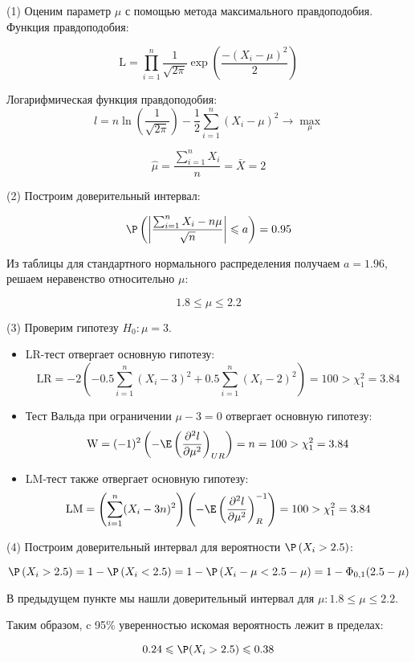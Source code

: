 \documentclass[pdftex,11pt,openany]{book}\usepackage[]{graphicx}\usepackage[]{color}
\begin{document}
\begin{solution}
(1) Оценим параметр $\mu$ с помощью метода максимального правдоподобия. Функция правдоподобия:

\[
\text{L} = \prod_{i=1}^{n} \frac{1}{\sqrt{2\pi}}\exp\left( \frac{-\left( X_i -\mu\right) ^2}{2}\right)
\]

Логарифмическая функция правдоподобия:
\[l = n \ln \left( \frac{1}{\sqrt{2\pi}}\right) - \frac{1}{2}\sum_{i=1}^{n}\left( X_i-\mu\right) ^2 \to \max_\mu\]

\[\hat{\mu} = \frac{\sum_{i=1}^{n}X_i}{n} = \bar{X} = 2\]

(2) Построим доверительный интервал:

\[\P\left(\left|\frac{\sum_{i=1}^{n}X_i - n\mu}{\sqrt{n}} \right| \leqslant a \right) = 0.95 \]

Из таблицы для стандартного нормального распределения получаем $a=1.96$, решаем неравенство относительно $\mu$:

\[1.8 \leqslant \mu \leqslant 2.2\]

(3) Проверим гипотезу $H_0: \mu = 3$.
\begin{itemize}
  \item LR-тест отвергает основную гипотезу:
	\[\text{LR} = -2\left( -0.5\sum_{i=1}^{n}(X_i-3)^2+0.5\sum_{i=1}^{n}(X_i-2)^2\right)  = 100 > \chi^2_1 = 3.84\]
	\item Тест Вальда  при ограничении $\mu - 3 = 0$ отвергает основную гипотезу:
	\[\text{W} = (-1)^2\left(-\E\left(\frac{\partial^2l}{\partial \mu^2}\right) _{UR}\right)  = n = 100 > \chi^2_1 = 3.84\]
	\item LM-тест также отвергает основную гипотезу:
	\[\text{LM} = \left(\sum_{i=1}^{n}(X_i-3n)^2\right) \left( -\E\left(\frac{\partial^2l}{\partial \mu^2}\right)^{-1}_{R}\right) = 100 > \chi^2_1 = 3.84\]
\end{itemize}

(4) Построим доверительный интервал для вероятности $\P\left( X_i>2.5\right)$:

\[\P\left( X_i>2.5\right) = 1 - \P\left( X_i<2.5\right)  = 1 - \P\left(X_i-\mu < 2.5-\mu \right) = 1 - \Phi_{0,1}(2.5-\mu)\]

В предыдущем пункте мы нашли доверительный интервал для $\mu: 1.8 \leqslant \mu \leqslant 2.2$.

Таким образом, c 95\% уверенностью искомая вероятность лежит в пределах:

\[0.24 \leqslant \P(X_i>2.5) \leqslant 0.38\]
\end{solution}
\end{document}
